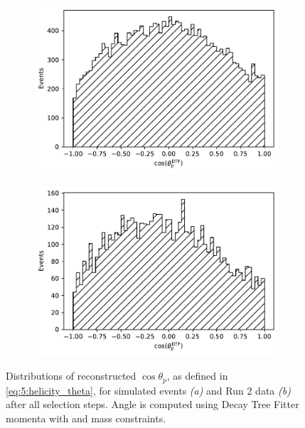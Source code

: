 \begin{figure}[t]
	\centering
	\begin{subfigure}{.45\textwidth}
		\includegraphics[height=.2\textheight]{graphics/05-angular_distributions/MCRECO_theta_reco.pdf}
		\caption{}
		\label{fig:5:MCRECO_theta_reco}
	\end{subfigure}
	\begin{subfigure}{.45\textwidth}
		\includegraphics[height=.2\textheight]{graphics/05-angular_distributions/RUN2_theta_reco.pdf}
		\caption{}
		\label{fig:5:RUN2_theta_reco}
	\end{subfigure}
	\caption{Distributions of reconstructed $\cos\theta_p$, as defined in \eqref{eq:5:helicity_theta}, for simulated \demonstratorshort events \textit{(a)} and Run 2 data \textit{(b)} after all selection steps. Angle \thetap is computed using Decay Tree Fitter momenta with \jpsi and \lz mass constraints.}
	\label{fig:5:theta_distributions_reco}
\end{figure}

